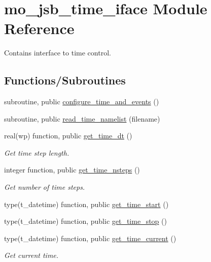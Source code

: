 \hypertarget{namespacemo__jsb__time__iface}{}\section{mo\+\_\+jsb\+\_\+time\+\_\+iface Module Reference}
\label{namespacemo__jsb__time__iface}


Contains interface to time control.  


\subsection*{Functions/\+Subroutines}
\begin{DoxyCompactItemize}
\item 
subroutine, public \hyperlink{namespacemo__jsb__time__iface_a72043de558313d19de7e74737fb0d405}{configure\+\_\+time\+\_\+and\+\_\+events} ()
\item 
subroutine, public \hyperlink{namespacemo__jsb__time__iface_aa849b3904eff063cc37a76aeb2cc9e2d}{read\+\_\+time\+\_\+namelist} (filename)
\item 
real(wp) function, public \hyperlink{namespacemo__jsb__time__iface_ab168c46be9abca5f386500550a020775}{get\+\_\+time\+\_\+dt} ()
\begin{DoxyCompactList}\small\item\em Get time step length. \end{DoxyCompactList}\item 
integer function, public \hyperlink{namespacemo__jsb__time__iface_a3f7d59d4cfa4bebbe8460d5649b660df}{get\+\_\+time\+\_\+nsteps} ()
\begin{DoxyCompactList}\small\item\em Get number of time steps. \end{DoxyCompactList}\item 
type(t\+\_\+datetime) function, public \hyperlink{namespacemo__jsb__time__iface_ae2944548df61fb74efc201b6f7638abc}{get\+\_\+time\+\_\+start} ()
\item 
type(t\+\_\+datetime) function, public \hyperlink{namespacemo__jsb__time__iface_ac6e0e1e6c162a0d29f99e6ec9988a664}{get\+\_\+time\+\_\+stop} ()
\item 
type(t\+\_\+datetime) function, public \hyperlink{namespacemo__jsb__time__iface_adbc8c1cd58176897cabb83ffbb84ad31}{get\+\_\+time\+\_\+current} ()
\begin{DoxyCompactList}\small\item\em Get current time. \end{DoxyCompactList}\item 

\end{DoxyCompactItemize}
